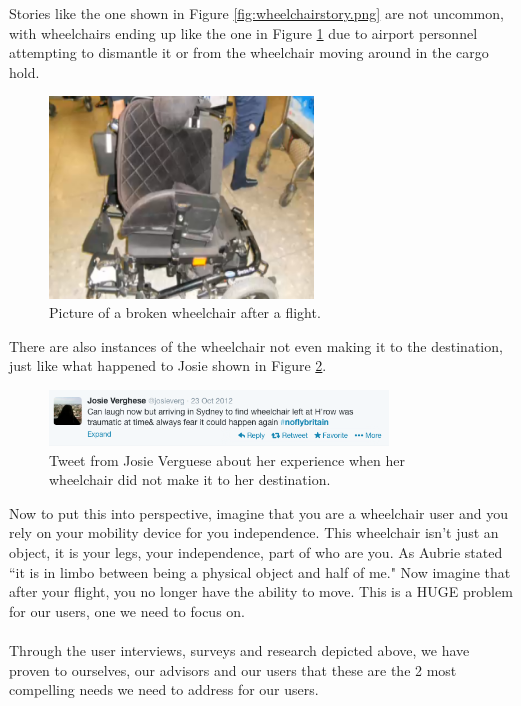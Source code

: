 Stories like the one shown in Figure \ref{fig:wheelchairstory.png} are not uncommon, with wheelchairs ending up like the one in Figure \ref{fig:brokenwheelchair.png} due to airport personnel attempting to dismantle it or from the wheelchair moving around in the cargo hold. 


\begin{figure}[h]
  \centering
     \includegraphics[width=7cm]{images/brokenwheelchair.png}
   \caption{Picture of a broken wheelchair after a flight. \cite{broken_wheelchair}}
  \label{fig:brokenwheelchair.png}
\end{figure}

There are also instances of the wheelchair not even making it to the destination, just like what happened to Josie shown in Figure \ref{fig:leftwheelchair.png}. 

\begin{figure}[h]
  \centering
     \includegraphics[width=9cm]{images/leftwheelchair.png}
   \caption{Tweet from Josie Verguese about her experience when her wheelchair did not make it to her destination.}
  \label{fig:leftwheelchair.png}
\end{figure}

Now to put this into perspective, imagine that you are a wheelchair user and you rely on your mobility device for you independence. This wheelchair isn't just an object, it is your legs, your independence, part of who are you. As Aubrie stated ``it is in limbo between being a physical object and half of me." Now imagine that after your flight, you no longer have the ability to move. This is a HUGE problem for our users, one we need to focus on. \\
\\

 Through  the user interviews, surveys and research depicted above, we have proven to ourselves, our advisors and our users that these are the 2 most compelling needs we need to address for our users. 


